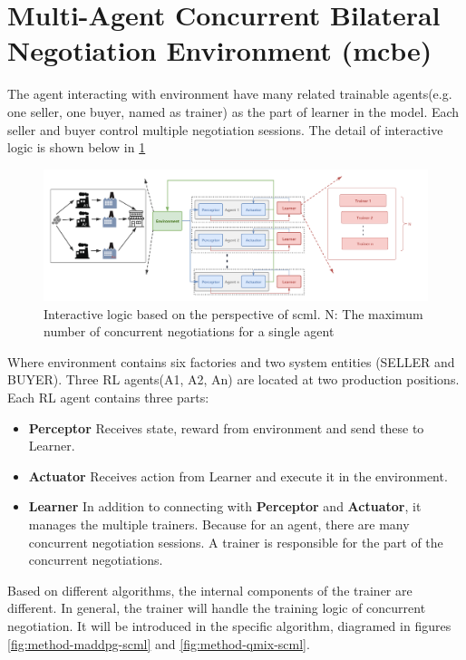 \section{Multi-Agent Concurrent Bilateral Negotiation Environment (\gls{mcbe})} 
The agent interacting with environment have many related trainable agents(e.g. one seller, one buyer, named as trainer) as the part of learner in the model. Each seller and buyer control multiple negotiation sessions. The detail of interactive logic is shown below in \ref{fig:interacting-logic-scml}

\begin{figure}[htbp]
\centering
\includegraphics[width=1.0\textwidth]{./images/scnk.png}
\caption{Interactive logic based on the perspective of \gls{scml}. N: The maximum number of concurrent negotiations for a single agent}
\label{fig:interacting-logic-scml}
\end{figure}

Where environment contains six factories and two system entities (SELLER and BUYER). Three RL agents(A1, A2, An) are located at two production positions. Each RL agent contains three parts:

\begin{itemize}
\item \textbf{Perceptor} Receives state, reward from environment and send these to Learner.
\item \textbf{Actuator} Receives action from Learner and execute it in the environment.
\item \textbf{Learner} In addition to connecting with \textbf{Perceptor} and \textbf{Actuator}, it manages the multiple trainers. Because for an agent, there are many concurrent negotiation sessions. A trainer is responsible for the part of the concurrent negotiations.
\end{itemize}

Based on different algorithms, the internal components of the trainer are different. In general, the trainer will handle the training logic of concurrent negotiation. It will be introduced in the specific algorithm, diagramed in figures \ref{fig:method-maddpg-scml} and \ref{fig:method-qmix-scml}.

